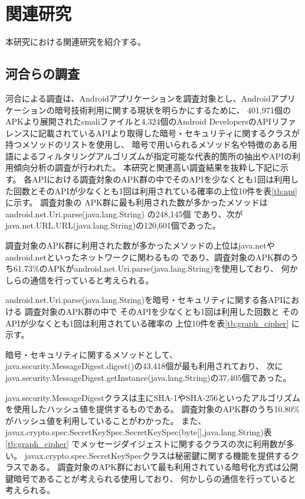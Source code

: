 \newpage
\section{関連研究} %
本研究における関連研究を紹介する。
\subsection{河合らの調査}
河合による調査は、Androidアプリケーションを調査対象とし、Androidアプリケーションの暗号技術利用に関する現状を明らかにするために、
401,971個のAPKより展開されたsmaliファイルと4,324個のAndroid DevelopersのAPIリファレンスに記載されているAPIより取得した暗号・セキュリティに関するクラスが持つメソッドのリストを使用し、
暗号で用いられるメソッド名や特徴のある用語によるフィルタリングアルゴリズムが指定可能な代表的箇所の抽出やAPIの利用傾向分析の調査が行われた。
本研究と関連高い調査結果を抜粋し下記に示す。
各APIにおける調査対象のAPK群の中でそのAPIを少なくとも1回は利用した回数とそのAPIが少なくとも1回は利用されている確率の上位10件を表\ref{tb:api}に示す。
調査対象の APK群に最も利用された数が多かったメソッドは
android.net.Uri.parse(java.lang.String) の248,145個
であり、次がjava.net.URL.URL(java.lang.String)の120,601個であった。


調査対象のAPK群に利用された数が多かったメソッドの上位はjava.netやandroid.netといったネットワークに関わるもの
であり、調査対象のAPK群のうち61.73\%のAPKがandroid.net.Uri.parse(java.lang.String)を使用しており、
何かしらの通信を行っていると考えられる。

android.net.Uri.parse(java.lang.String)を暗号・セキュリティに関する各APIにおける
調査対象のAPK群の中で
そのAPIを少なくとも1回は利用した回数と
そのAPIが少なくとも1回は利用されている確率の
上位10件を表\ref{tb:graph_cipher}
に示す。

暗号・セキュリティに関するメソッドとして、
java.security.MessageDigest.digest()の43,418個が最も利用されており、
次にjava.security.MessageDigest.getInstance(java.lang.String)の37,405個であった。


java.security.MessageDigestクラスは主にSHA-1やSHA-256といったアルゴリズムを使用したハッシュ値を提供するものである。
調査対象のAPK群のうち10.80\%がハッシュ値を利用していることがわかった。
また、
javax.crypto.spec.SecretKeySpec.SecretKeySpec(byte[],java.lang.String)表\ref{tb:graph_cipher}
でメッセージダイジェストに関するクラスの次に利用数が多い。
javax.crypto.spec.SecretKeySpecクラスは秘密鍵に関する機能を提供するクラスである。
調査対象のAPK群において最も利用されている暗号化方式は公開鍵暗号であることが考えられる使用しており、
何かしらの通信を行っていると考えられる。


